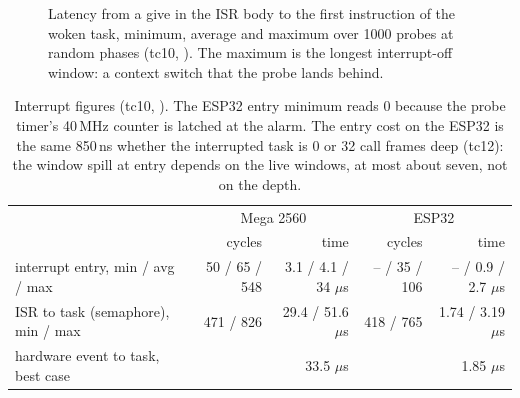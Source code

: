 \begin{figure}[htbp]
\centering
{}
\caption{Latency from a give in the ISR body to the first instruction of the woken task,
minimum, average and maximum over 1000 probes at random phases (tc10, \measDate). The
maximum is the longest interrupt-off window: a context switch that the probe lands
behind.}
\label{fig:isr}
\end{figure}

\begin{table}[htbp]
\centering\small
\begin{tabular}{@{}lrrrr@{}}
\toprule
 & \multicolumn{2}{c}{Mega 2560} & \multicolumn{2}{c}{ESP32} \\
 & cycles & time & cycles & time \\
\midrule
interrupt entry, min / avg / max         & 50 / 65 / 548 & 3.1 / 4.1 / 34 $\mu$s & -- / 35 / 106 & -- / 0.9 / 2.7 $\mu$s \\
ISR to task (semaphore), min / max       & 471 / 826 & 29.4 / 51.6 $\mu$s & 418 / 765 & 1.74 / 3.19 $\mu$s \\
hardware event to task, best case        & & 33.5 $\mu$s & & 1.85 $\mu$s \\
\bottomrule
\end{tabular}
\caption{Interrupt figures (tc10, \measDate). The ESP32 entry minimum reads 0 because the
probe timer's 40\,MHz counter is latched at the alarm. The entry cost on the ESP32 is
the same 850\,ns whether the interrupted task is 0 or 32 call frames deep (tc12): the
window spill at entry depends on the live windows, at most about seven, not on the
depth.}
\label{tab:isr}
\end{table}

